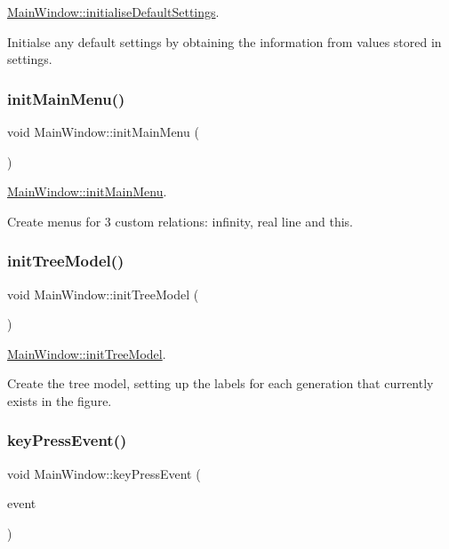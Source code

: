 \mbox{\hyperlink{class_main_window_a72e9fc361f05240f439fb17ff78a40cc}{Main\+Window\+::initialise\+Default\+Settings}}. 

Initialse any default settings by obtaining the information from values stored in settings. \mbox{\label{class_main_window_ae78352e402084a7c6518e97056070677}} 
\subsubsection{\texorpdfstring{init\+Main\+Menu()}{initMainMenu()}}
{\footnotesize\ttfamily void Main\+Window\+::init\+Main\+Menu (\begin{DoxyParamCaption}{ }\end{DoxyParamCaption})}



\mbox{\hyperlink{class_main_window_ae78352e402084a7c6518e97056070677}{Main\+Window\+::init\+Main\+Menu}}. 

Create menus for 3 custom relations\+: infinity, real line and this. \mbox{\label{class_main_window_a3e45090789e16c49079857ab0617b239}} 
\subsubsection{\texorpdfstring{init\+Tree\+Model()}{initTreeModel()}}
{\footnotesize\ttfamily void Main\+Window\+::init\+Tree\+Model (\begin{DoxyParamCaption}{ }\end{DoxyParamCaption})}



\mbox{\hyperlink{class_main_window_a3e45090789e16c49079857ab0617b239}{Main\+Window\+::init\+Tree\+Model}}. 

Create the tree model, setting up the labels for each generation that currently exists in the figure. \mbox{\label{class_main_window_a9c4f542263838b9ecd06eae839a42a34}} 
\subsubsection{\texorpdfstring{key\+Press\+Event()}{keyPressEvent()}}
{\footnotesize\ttfamily void Main\+Window\+::key\+Press\+Event (\begin{DoxyParamCaption}\item[{Q\+Key\+Event $\ast$}]{event }\end{DoxyParamCaption})}



